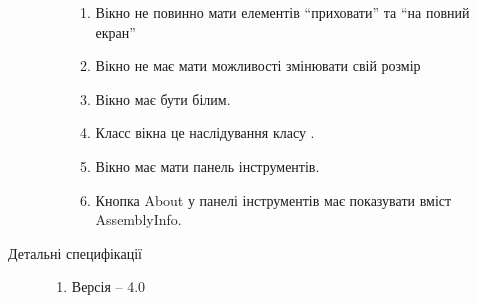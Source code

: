 \begin{description}
\begin{enumerate}
\begin{enumerate}
					\item Вікно не повинно мати елементів \enquote{приховати} та \enquote{на повний екран}
					\item Вікно не має мати можливості змінювати свій розмір
					\item Вікно має бути білим.
					\item Класс вікна  це наслідування класу .
					\item Вікно має мати панель інструментів.
					\item Кнопка About у панелі інструментів має показувати вміст AssemblyInfo.
				\end{enumerate}
		\end{enumerate}
	\item[Детальні специфікації]\directenv%
		\begin{enumerate}
			\item Версія  -- 4.0
		\end{enumerate}
\end{description}
